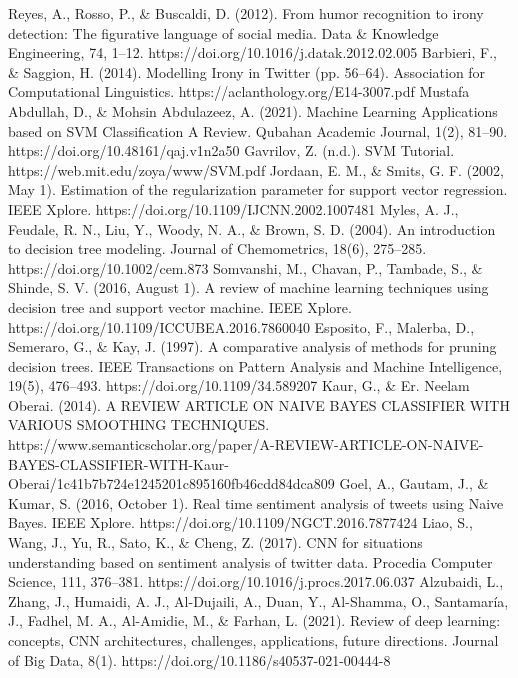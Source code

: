 \documentclass[a4paper]{article}
\begin{document}
\begin{thebibliography}{}
    Reyes, A., Rosso, P., \& Buscaldi, D. (2012). From humor recognition to irony detection: The figurative language of social media. Data \& Knowledge Engineering, 74, 1–12. https://doi.org/10.1016/j.datak.2012.02.005
    Barbieri, F., \& Saggion, H. (2014). Modelling Irony in Twitter (pp. 56–64). Association for Computational Linguistics. https://aclanthology.org/E14-3007.pdf
    Mustafa Abdullah, D., \& Mohsin Abdulazeez, A. (2021). Machine Learning Applications based on SVM Classification A Review. Qubahan Academic Journal, 1(2), 81–90. https://doi.org/10.48161/qaj.v1n2a50
    Gavrilov, Z. (n.d.). SVM Tutorial. https://web.mit.edu/zoya/www/SVM.pdf
    Jordaan, E. M., \& Smits, G. F. (2002, May 1). Estimation of the regularization parameter for support vector regression. IEEE Xplore. https://doi.org/10.1109/IJCNN.2002.1007481
    Myles, A. J., Feudale, R. N., Liu, Y., Woody, N. A., \& Brown, S. D. (2004). An introduction to decision tree modeling. Journal of Chemometrics, 18(6), 275–285. https://doi.org/10.1002/cem.873
    Somvanshi, M., Chavan, P., Tambade, S., \& Shinde, S. V. (2016, August 1). A review of machine learning techniques using decision tree and support vector machine. IEEE Xplore. https://doi.org/10.1109/ICCUBEA.2016.7860040
    Esposito, F., Malerba, D., Semeraro, G., \& Kay, J. (1997). A comparative analysis of methods for pruning decision trees. IEEE Transactions on Pattern Analysis and Machine Intelligence, 19(5), 476–493. https://doi.org/10.1109/34.589207
    Kaur, G., \& Er. Neelam Oberai. (2014). A REVIEW ARTICLE ON NAIVE BAYES CLASSIFIER WITH VARIOUS SMOOTHING TECHNIQUES. https://www.semanticscholar.org/paper/A-REVIEW-ARTICLE-ON-NAIVE-BAYES-CLASSIFIER-WITH-Kaur-Oberai/1c41b7b724e1245201c895160fb46cdd84dca809
    Goel, A., Gautam, J., \& Kumar, S. (2016, October 1). Real time sentiment analysis of tweets using Naive Bayes. IEEE Xplore. https://doi.org/10.1109/NGCT.2016.7877424
    Liao, S., Wang, J., Yu, R., Sato, K., \& Cheng, Z. (2017). CNN for situations understanding based on sentiment analysis of twitter data. Procedia Computer Science, 111, 376–381. https://doi.org/10.1016/j.procs.2017.06.037
    Alzubaidi, L., Zhang, J., Humaidi, A. J., Al-Dujaili, A., Duan, Y., Al-Shamma, O., Santamaría, J., Fadhel, M. A., Al-Amidie, M., \& Farhan, L. (2021). Review of deep learning: concepts, CNN architectures, challenges, applications, future directions. Journal of Big Data, 8(1). https://doi.org/10.1186/s40537-021-00444-8

\end{thebibliography}
\end{document}
